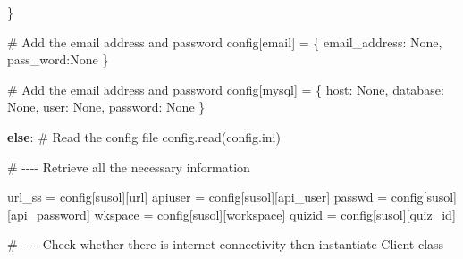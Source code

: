 \documentclass[
  letterpaper,
  DIV=11,
  numbers=noendperiod]{scrreprt}
\newenvironment{Shaded}{\begin{snugshade}}{\end{snugshade}}
\newcommand{\CommentTok}[1]{\textcolor[rgb]{0.37,0.37,0.37}{#1}}
\newcommand{\ControlFlowTok}[1]{\textcolor[rgb]{0.00,0.23,0.31}{\textbf{#1}}}
\newcommand{\NormalTok}[1]{\textcolor[rgb]{0.00,0.23,0.31}{#1}}
\newcommand{\OperatorTok}[1]{\textcolor[rgb]{0.37,0.37,0.37}{#1}}
\newcommand{\StringTok}[1]{\textcolor[rgb]{0.13,0.47,0.30}{#1}}
\newcommand{\VariableTok}[1]{\textcolor[rgb]{0.07,0.07,0.07}{#1}}
\begin{document}
\begin{Shaded}
\begin{Highlighting}[]
\NormalTok{    \}}
    
  \CommentTok{\# Add the email address and password}
\NormalTok{    config[}\StringTok{\textquotesingle{}email\textquotesingle{}}\NormalTok{] }\OperatorTok{=}\NormalTok{ \{}
        \StringTok{\textquotesingle{}email\_address\textquotesingle{}}\NormalTok{: }\VariableTok{None}\NormalTok{,}
        \StringTok{\textquotesingle{}pass\_word\textquotesingle{}}\NormalTok{:}\VariableTok{None}
\NormalTok{    \}}
    
  \CommentTok{\# Add the email address and password}
\NormalTok{    config[}\StringTok{\textquotesingle{}mysql\textquotesingle{}}\NormalTok{] }\OperatorTok{=}\NormalTok{ \{}
        \StringTok{\textquotesingle{}host\textquotesingle{}}\NormalTok{: }\VariableTok{None}\NormalTok{,}
        \StringTok{\textquotesingle{}database\textquotesingle{}}\NormalTok{: }\VariableTok{None}\NormalTok{,}
        \StringTok{\textquotesingle{}user\textquotesingle{}}\NormalTok{: }\VariableTok{None}\NormalTok{,}
        \StringTok{\textquotesingle{}password\textquotesingle{}}\NormalTok{: }\VariableTok{None}
\NormalTok{    \}}
  
\ControlFlowTok{else}\NormalTok{:}
  \CommentTok{\# Read the config file}
\NormalTok{  config.read(}\StringTok{\textquotesingle{}config.ini\textquotesingle{}}\NormalTok{)}
  
  
\CommentTok{\# {-}{-}{-}{-} Retrieve all the necessary information}

\NormalTok{url\_ss }\OperatorTok{=}\NormalTok{ config[}\StringTok{\textquotesingle{}susol\textquotesingle{}}\NormalTok{][}\StringTok{\textquotesingle{}url\textquotesingle{}}\NormalTok{]}
\NormalTok{apiuser }\OperatorTok{=}\NormalTok{ config[}\StringTok{\textquotesingle{}susol\textquotesingle{}}\NormalTok{][}\StringTok{\textquotesingle{}api\_user\textquotesingle{}}\NormalTok{]}
\NormalTok{passwd }\OperatorTok{=}\NormalTok{ config[}\StringTok{\textquotesingle{}susol\textquotesingle{}}\NormalTok{][}\StringTok{\textquotesingle{}api\_password\textquotesingle{}}\NormalTok{]}
\NormalTok{wkspace }\OperatorTok{=}\NormalTok{ config[}\StringTok{\textquotesingle{}susol\textquotesingle{}}\NormalTok{][}\StringTok{\textquotesingle{}workspace\textquotesingle{}}\NormalTok{]}
\NormalTok{quizid }\OperatorTok{=}\NormalTok{ config[}\StringTok{\textquotesingle{}susol\textquotesingle{}}\NormalTok{][}\StringTok{\textquotesingle{}quiz\_id\textquotesingle{}}\NormalTok{]}


\CommentTok{\# {-}{-}{-}{-} Check whether there is internet connectivity then instantiate Client class}


\end{Highlighting}
\end{Shaded}
\end{document}
